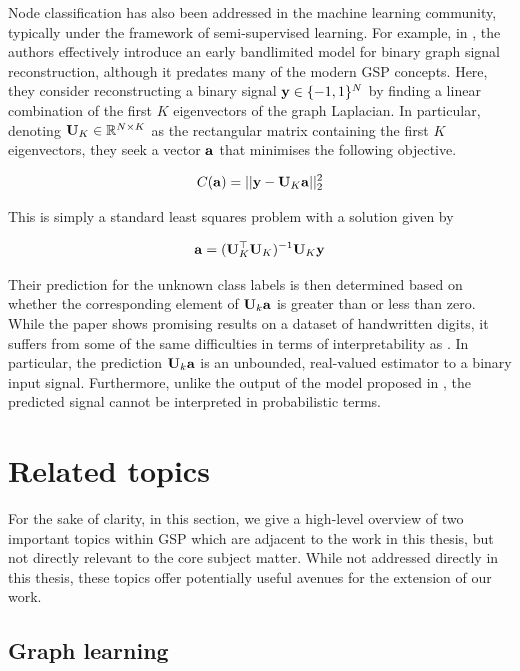 Node classification has also been addressed in the machine learning community, typically under the framework of semi-supervised learning. For example, in \cite{Belkin2002}, the authors effectively introduce an early bandlimited model for binary graph signal reconstruction, although it predates many of the modern GSP concepts. Here, they consider reconstructing a binary signal $\mathbf{y} \in \{-1, 1\}^{N}$ by finding a linear combination of the first $K$ eigenvectors of the graph Laplacian. In particular, denoting $\mathbf{U}_K \in \mathbb{R}^{N \times K}$ as the rectangular matrix containing the first $K$ eigenvectors, they seek a vector $\mathbf{a}$ that minimises the following objective.

\begin{equation}
    C(\mathbf{a}) = || \mathbf{y} - \mathbf{U}_K \mathbf{a} ||^2_2
\end{equation}

This is simply a standard least squares problem with a solution given by 

\begin{equation}
    \mathbf{a} = (\mathbf{U}_K^\top \mathbf{U}_K)^{-1} \mathbf{U}_K \mathbf{y}
\end{equation}

Their prediction for the unknown class labels is then determined based on whether the corresponding element of $\mathbf{U}_k \mathbf{a}$ is greater than or less than zero. While the paper shows promising results on a dataset of handwritten digits, it suffers from some of the same difficulties in terms of interpretability as \cite{Sandryhaila2013a}. In particular, the prediction $\mathbf{U}_k \mathbf{a}$ is an unbounded, real-valued estimator to a binary input signal. Furthermore, unlike the output of the model proposed in \cite{Tran2020}, the predicted signal cannot be interpreted in probabilistic terms. 


\section{Related topics}

For the sake of clarity, in this section, we give a high-level overview of two important topics within GSP which are adjacent to the work in this thesis, but not directly relevant to the core subject matter. While not addressed directly in this thesis, these topics offer potentially useful avenues for the extension of our work. 


\subsection{Graph learning}

